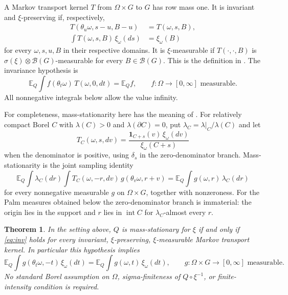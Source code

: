 \documentclass[11pt]{article}
\newtheorem{theorem}{Theorem}
\newcommand{\BB}{\mathcal B(G)}
\newcommand{\ind}{\mathbf 1}
\newcommand{\EQ}{\mathbb E_Q}
\begin{document}
A Markov transport kernel $T$ from $\Omega\times G$ to $G$ has row mass one. It is invariant and $\xi$-preserving if, respectively,
\begin{align}
 T(\theta_u\omega,s-u,B-u)&=T(\omega,s,B), \label{eq:cov}\\
 \int T(\omega,s,B)\,\xi_\omega(ds)&=\xi_\omega(B) \label{eq:pres}
\end{align}
for every $\omega,s,u,B$ in their respective domains. It is $\xi$-measurable if $T(\cdot,\cdot,B)$ is $\sigma(\xi)\otimes\BB$-measurable for every $B\in\BB$. This is the definition in \cite[Section 7]{LT09}. The invariance hypothesis is
\begin{equation}
 \EQ\int f(\theta_t\omega)\,T(\omega,0,dt)=\EQ f,
 \qquad f:\Omega\to[0,\infty]\text{ measurable}. \label{eq:inv}
\end{equation}
All nonnegative integrals below allow the value infinity.

For completeness, mass-stationarity here has the meaning of \cite[Definition 6.1]{LT09}. For relatively compact Borel $C$ with $\lambda(C)>0$ and $\lambda(\partial C)=0$, put $\lambda_C=\lambda|_C/\lambda(C)$ and let
\[
 T_C(\omega,s,dv)=\frac{\ind_{C+s}(v)\,\xi_\omega(dv)}{\xi_\omega(C+s)}
\]
when the denominator is positive, using $\delta_s$ in the zero-denominator branch. Mass-stationarity is the joint sampling identity
\begin{equation}
 \EQ\int\lambda_C(dr)\int T_C(\omega,-r,dv)\,
       g(\theta_v\omega,r+v)
 =\EQ\int g(\omega,r)\,\lambda_C(dr) \label{eq:ms}
\end{equation}
for every nonnegative measurable $g$ on $\Omega\times G$, together with nonzeroness. For the Palm measures obtained below the zero-denominator branch is immaterial: the origin lies in the support and $r$ lies in $\operatorname{int}C$ for $\lambda_C$-almost every $r$.

\begin{theorem}\label{thm:main}
In the setting above, $Q$ is mass-stationary for $\xi$ if and only if \eqref{eq:inv} holds for every invariant, $\xi$-preserving, $\xi$-measurable Markov transport kernel. In particular this hypothesis implies
\begin{equation}
 \EQ\int g(\theta_t\omega,-t)\,\xi_\omega(dt)
 =\EQ\int g(\omega,t)\,\xi_\omega(dt),
 \qquad g:\Omega\times G\to[0,\infty]\text{ measurable}. \label{eq:mecke}
\end{equation}
No standard Borel assumption on $\Omega$, sigma-finiteness of $Q\circ\xi^{-1}$, or finite-intensity condition is required.
\end{theorem}
\end{document}
